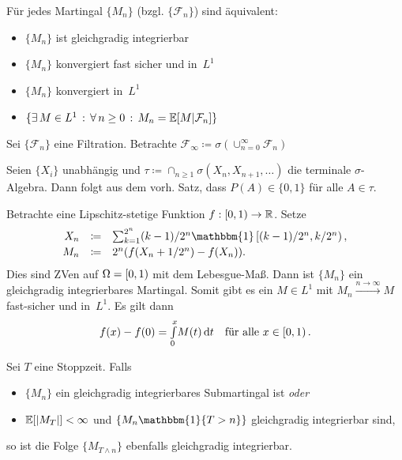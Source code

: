 \documentclass{cheat-sheet}
\newcommand{\E}{\mathbb{E}} %
\newcommand{\ind}{\mathbbm{1}} %
\newcommand{\Filt}{\mathcal{F}} %
\begin{document}
\begin{satz}
  Für jedes Martingal $\{ M_n \}$ (bzgl. $\{ \Filt_n \}$) sind äquivalent:
  \begin{itemize}
    \item $\{ M_n \}$ ist gleichgradig integrierbar
    \item $\{ M_n \}$ konvergiert fast sicher und in~$L^1$
    \item $\{ M_n \}$ konvergiert in~$L^1$
    \item $\{ \ex{M \in L^1} \fa{n \geq 0} M_n = \E[ M | \Filt_n ] \}$
  \end{itemize}
\end{satz}

\begin{satz}
  Sei $\{ \mathcal{F}_n \}$ eine Filtration.
  Betrachte $\mathcal{F}_\infty \coloneqq \sigma(\cup_{n=0}^\infty \mathcal{F}_n)$
\end{satz}

\begin{bsp}
  Seien $\{ X_i \}$ unabhängig und $\tau \coloneqq \cap_{n \geq 1} \sigma(X_n, X_{n+1}, \ldots)$ die terminale $\sigma$-Algebra.
  Dann folgt aus dem vorh. Satz, dass $P(A) \in \{ 0, 1 \}$ für alle $A \in \tau$.
\end{bsp}

\begin{bsp}
  Betrachte eine Lipschitz-stetige Funktion $f : \left[ 0, 1 \right) \to \mathbb{R}$.
  Setze
  \[
    \begin{array}{r c l}
      X_n &\coloneqq& {\sum}_{k=1}^{2^n} (k-1)/2^n \ind \cointerval{(k-1)/2^n}{k/2^n}, \\[0.2em]
      M_n &\coloneqq& 2^n (f(X_n + 1/2^n) - f(X_n)).
    \end{array}
  \]
  Dies sind ZVen auf $\Omega = \left[ 0, 1 \right)$ mit dem Lebesgue-Maß.
  Dann ist $\{ M_n \}$ ein gleichgradig integrierbares Martingal.
  Somit gibt es ein $M \in L^1$ mit $M_n \xrightarrow{n \to \infty} M$ fast-sicher und in~$L^1$.
  Es gilt dann
  \[
    f(x) - f(0) = {\textstyle \int\limits_{0}^{x}} M(t) \,\mathrm{d} t
    \quad \text{für alle } x \in \left[ 0, 1 \right).
  \]
\end{bsp}


\begin{satz}
  Sei $T$ eine Stoppzeit.
  Falls
  \begin{itemize}
    \item $\{ M_n \}$ ein gleichgradig integrierbares Submartingal ist \textit{oder}
    \item $\E[ \abs{M_T} ] < \infty$ und $\{ M_n \ind \{ T > n \} \}$ gleichgradig integrierbar sind,
  \end{itemize}
  so ist die Folge $\{ M_{T \wedge n} \}$ ebenfalls gleichgradig integrierbar.
\end{satz}
\end{document}
